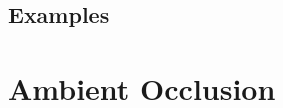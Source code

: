 \documentclass{beamer}
\begin{document}
		\subsection{Examples}

	\section{Ambient Occlusion}
\end{document}

